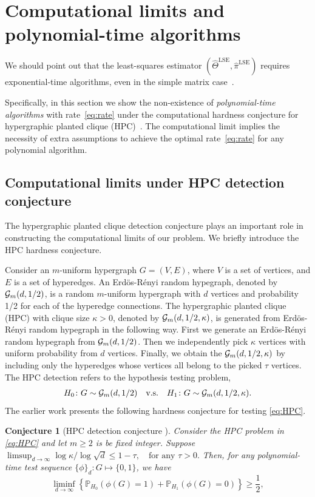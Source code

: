 \documentclass[12pt]{article}
\newtheorem{conj}{Conjecture}
\theoremstyle{definition}
\begin{document}
\section{Computational limits and polynomial-time algorithms}\label{sec:borda}

We should point out that the least-squares estimator $(\hat\Theta^{\text{LSE}},\hat\pi^{\text{LSE}})$ requires exponential-time algorithms, even in the simple matrix case~\cite{gao2015rate}. {\color{blue}Specifically, in this section {\color{blue} we show the non-existence of \emph{polynomial-time algorithms} with rate~\eqref{eq:rate} under the computational hardness conjecture for hypergraphic planted clique (HPC)~\cite{luo2022tensor}. The computational limit implies the necessity of extra assumptions to achieve the optimal rate~\eqref{eq:rate} for any polynomial algorithm.}
\vspace{-.5cm}
{\color{blue}
\subsection{Computational limits under HPC detection conjecture}\label{sec:complimit}
The hypergraphic planted clique detection conjecture plays an important role in constructing the computational limits of our problem. We briefly introduce the HPC hardness conjecture. 

Consider an $m$-uniform hypergraph $G = (V,E)$, where $V$ is a set of vertices, and $E$ is a set of hyperedges. An Erd\"os-R\'enyi random hypegraph, denoted by $\mathcal{G}_m(d,1/2)$, is a random $m$-uniform hypergraph with $d$ vertices and probability 1/2 for each of the hyperedge connections. The hypergraphic planted clique (HPC) with clique size $\kappa>0$, denoted by $\mathcal{G}_m(d,1/2,\kappa)$, is generated from Erd\"os-R\'enyi random hypegraph in the following way. First we generate an Erd\"os-R\'enyi random hypegraph from $\mathcal{G}_m(d,1/2)$. Then we independently pick $\kappa$ vertices with uniform probability from $d$ vertices. Finally, we obtain the $\mathcal{G}_m(d,1/2,\kappa)$ by including only the hyperedges whose vertices all belong to the picked $\tau$ vertices. The HPC detection refers to the hypothesis testing problem, 
\begin{align}\label{eq:HPC}
    H_0\colon G\sim \mathcal{G}_m(d,1/2)\quad\text{v.s.}\quad H_1\colon G\sim \mathcal{G}_m(d,1/2,\kappa).
\end{align}
The earlier work \cite{luo2022tensor} presents the following hardness conjecture for testing \eqref{eq:HPC}.
\begin{conj}[HPC detection conjecture \citep{luo2022tensor}]\label{conj:1} Consider the HPC problem in \eqref{eq:HPC} and let $m\geq 2$ is be fixed integer. Suppose 
$
   \limsup_{d\rightarrow\infty} \log\kappa/\log\sqrt{d}\leq 1-\tau,\quad \text{for any }\tau >0.
   $
Then, for any polynomial-time test sequence $\{\phi\}_d\colon G \mapsto \{0,1\}$, we have 
\[
\liminf_{d\rightarrow\infty} \left\{\mathbb{P}_{H_0}(\phi(G) = 1)+ \mathbb{P}_{H_1}(\phi(G) = 0)\right\}\geq \frac{1}{2},
\]
\end{conj}

}}
\end{document}
